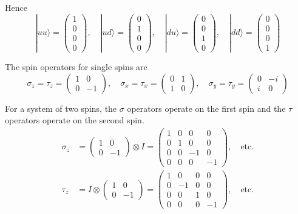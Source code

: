 Hence
\begin{equation*}
|uu\rangle=\begin{pmatrix}1\\0\\0\\0\end{pmatrix},
\quad
|ud\rangle=\begin{pmatrix}0\\1\\0\\0\end{pmatrix},
\quad
|du\rangle=\begin{pmatrix}0\\0\\1\\0\end{pmatrix},
\quad
|dd\rangle=\begin{pmatrix}0\\0\\0\\1\end{pmatrix}
\end{equation*}

The spin operators for single spins are
\begin{equation*}
\sigma_z=\tau_z=\begin{pmatrix}1&0\\0&-1\end{pmatrix},
\quad
\sigma_x=\tau_x=\begin{pmatrix}0&1\\1&0\end{pmatrix},
\quad
\sigma_y=\tau_y=\begin{pmatrix}0&-i\\i&0\end{pmatrix}
\end{equation*}

For a system of two spins, the $\sigma$ operators operate on the first spin
and the $\tau$ operators operate on the second spin.
\begin{align*}
\sigma_z&=\begin{pmatrix}1&0\\0&-1\end{pmatrix}\otimes I
=\begin{pmatrix}1&0&0&0\\0&1&0&0\\0&0&-1&0\\0&0&0&-1\end{pmatrix},\quad\text{etc.}
\\[1ex]
\tau_z&=I\otimes\begin{pmatrix}1&0\\0&-1\end{pmatrix}
=\begin{pmatrix}1&0&0&0\\0&-1&0&0\\0&0&1&0\\0&0&0&-1\end{pmatrix},\quad\text{etc.}
\end{align*}


